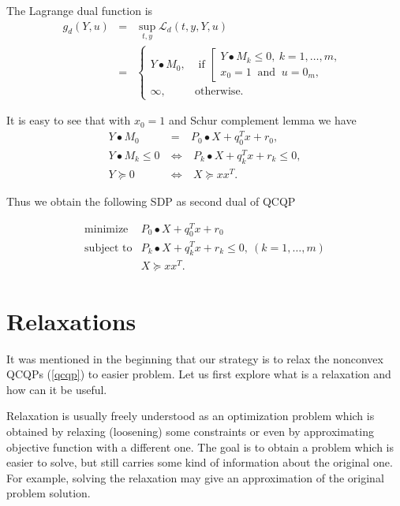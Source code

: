 \documentclass[12pt]{book}
\theoremstyle{definition}
\begin{document}
The Lagrange dual function is 
\begin{eqnarray}
g_d(Y,u) &=& \sup_{t,y} \mathcal{L}_d(t,y,Y,u) \\
&=&  \left\lbrace\begin{array}{ll}
Y\bullet M_0, & \mbox{ if } \left[\begin{array}{l} 
		 					 Y\bullet M_k \leq 0, \ k = 1,\dots ,m, \\
		 					 x_0 = 1 \ \mbox{ and } \
			 				 u = 0_m, 
			 				 \end{array}\right. \\
\infty, & \mbox{otherwise.} 
\end{array}\right. 
\end{eqnarray}

It is easy to see that with $x_0 = 1$ and Schur complement lemma we have
\begin{eqnarray}
Y\bullet M_0 &=& P_0\bullet X + q_0^Tx + r_0, \\
Y\bullet M_k \leq 0 \ &\Leftrightarrow& \ P_k\bullet X+ q_k^Tx + r_k \leq 0,\\
Y\succeq 0 \ &\Leftrightarrow& \ X\succeq xx^T.
\end{eqnarray}

Thus we obtain the following SDP as second dual of QCQP

\begin{equation}
\label{qcqpSecondDual} 
\begin{array}{ll}
\mbox{minimize}& P_0\bullet X + q_0^Tx + r_0\\
\mbox{subject to}& P_k\bullet X+ q_k^Tx + r_k \leq 0, \  (k = 1,\dots ,m)\\
& X\succeq xx^T.
\end{array} 
\end{equation}








\chapter{Relaxations}

It was mentioned in the beginning that our strategy is to relax the nonconvex QCQPs (\ref{qcqp}) to easier problem. Let us first explore what is a relaxation and how can it be useful. 

Relaxation is usually freely understood as an optimization problem which is obtained by relaxing (loosening) some constraints or even by approximating objective function with a different one. The goal is to obtain a problem which is easier to solve, but still carries some kind of information about the original one. For example, solving the relaxation may give an approximation of the original problem solution.
\end{document}
